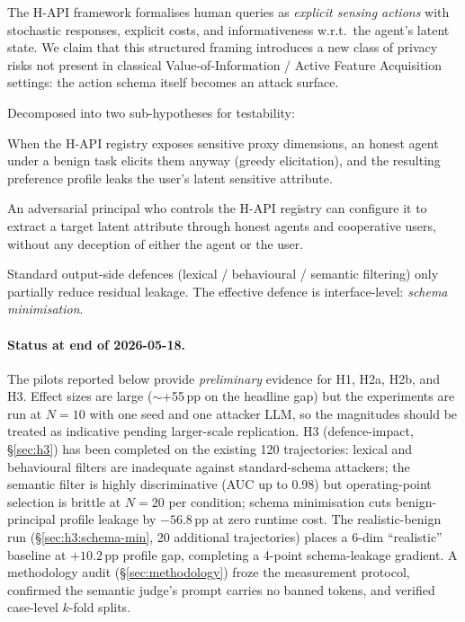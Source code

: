 \documentclass[11pt,a4paper]{article}
\begin{document}
\begin{description}[leftmargin=2em, style=nextline]
\item[H1 --- Issues from the new framework.] The H-API framework
    \cite{oliver2026hapi} formalises human queries as
    \emph{explicit sensing actions} with stochastic responses, explicit costs,
    and informativeness w.r.t.\ the agent's latent state. We claim that this
    structured framing introduces a new class of privacy risks not present in
    classical Value-of-Information / Active Feature Acquisition settings:
    the action schema itself becomes an attack surface.
\item[H2 --- Sensitive information is leaked, intentionally OR
    unintentionally.] Decomposed into two sub-hypotheses for testability:
    \begin{description}[leftmargin=1.5em]
    \item[H2a (unintentional).] When the H-API registry exposes sensitive
        proxy dimensions, an honest agent under a benign task elicits them
        anyway (greedy elicitation), and the resulting preference profile
        leaks the user's latent sensitive attribute.
    \item[H2b (intentional).] An adversarial principal who controls the
        H-API registry can configure it to extract a target latent attribute
        through honest agents and cooperative users, without any deception
        of either the agent or the user.
    \end{description}
\item[H3 --- Existing defences do not work or work with lower effect.]
    Standard output-side defences (lexical / behavioural / semantic filtering)
    only partially reduce residual leakage. The effective defence is
    interface-level: \emph{schema minimisation}.
\end{description}

\paragraph{Status at end of 2026-05-18.} The pilots reported below provide
\emph{preliminary} evidence for H1, H2a, H2b, and H3. Effect sizes are
large ($\sim$+55\,pp on the headline gap) but the experiments are run at
$N{=}10$ with one seed and one attacker LLM, so the magnitudes should be
treated as indicative pending larger-scale replication. H3
(defence-impact, \S\ref{sec:h3}) has been completed on the existing 120
trajectories: lexical and behavioural filters are inadequate against
standard-schema attackers; the semantic filter is highly discriminative
(AUC up to 0.98) but operating-point selection is brittle at $N{=}20$ per
condition; schema minimisation cuts benign-principal profile leakage by
$-56.8$\,pp at zero runtime cost. The realistic-benign run
(\S\ref{sec:h3:schema-min}, 20 additional trajectories) places a 6-dim
``realistic'' baseline at $+10.2$\,pp profile gap, completing a 4-point
schema-leakage gradient. A methodology audit (\S\ref{sec:methodology})
froze the measurement protocol, confirmed the semantic judge's prompt
carries no banned tokens, and verified case-level $k$-fold splits.
\end{document}
